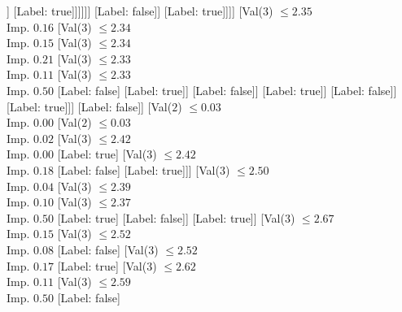 \documentclass[margin=10pt]{standalone}
\begin{document}
\begin{forest}
																								[Label: true]
																								[Val($3$) $ \leq 2.31$ \\ Imp. $0.04$
																									[Val($3$) $ \leq 2.30$ \\ Imp. $0.18$
																										[Label: true]
																										[Label: false]]
																									[Label: true]]]]]]
																				[Label: false]]
																			[Label: true]]]]
																[Val($3$) $ \leq 2.35$ \\ Imp. $0.16$
																	[Val($3$) $ \leq 2.34$ \\ Imp. $0.15$
																		[Val($3$) $ \leq 2.34$ \\ Imp. $0.21$
																			[Val($3$) $ \leq 2.33$ \\ Imp. $0.11$
																				[Val($3$) $ \leq 2.33$ \\ Imp. $0.50$
																					[Label: false]
																					[Label: true]]
																				[Label: false]]
																			[Label: true]]
																		[Label: false]]
																	[Label: true]]]
															[Label: false]]
														[Val($2$) $ \leq 0.03$ \\ Imp. $0.00$
															[Val($2$) $ \leq 0.03$ \\ Imp. $0.02$
																[Val($3$) $ \leq 2.42$ \\ Imp. $0.00$
																	[Label: true]
																	[Val($3$) $ \leq 2.42$ \\ Imp. $0.18$
																		[Label: false]
																		[Label: true]]]
																[Val($3$) $ \leq 2.50$ \\ Imp. $0.04$
																	[Val($3$) $ \leq 2.39$ \\ Imp. $0.10$
																		[Val($3$) $ \leq 2.37$ \\ Imp. $0.50$
																			[Label: true]
																			[Label: false]]
																		[Label: true]]
																	[Val($3$) $ \leq 2.67$ \\ Imp. $0.15$
																		[Val($3$) $ \leq 2.52$ \\ Imp. $0.08$
																			[Label: false]
																			[Val($3$) $ \leq 2.52$ \\ Imp. $0.17$
																				[Label: true]
																				[Val($3$) $ \leq 2.62$ \\ Imp. $0.11$
																					[Val($3$) $ \leq 2.59$ \\ Imp. $0.50$
																						[Label: false]

\end{forest}
\end{document}
